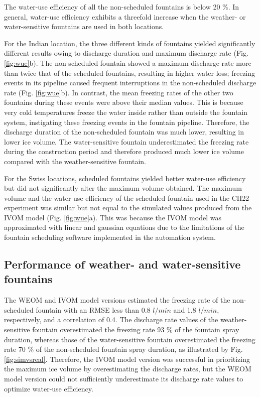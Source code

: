 \documentclass[tc, manuscript]{copernicus}
\begin{document}
The water-use efficiency of all the non-scheduled fountains is below 20 \%. In general, water-use efficiency
exhibits a threefold increase when the weather- or water-sensitive fountains are used in both
locations.  

For the Indian location, the three different kinds of fountains yielded significantly different results owing to
discharge duration and maximum discharge rate (Fig. \ref{fig:wue}b). The non-scheduled fountain showed a maximum
discharge rate more than twice that of the scheduled fountains, resulting in higher water loss; freezing events
in its pipeline caused frequent interruptions in the non-scheduled discharge rate (Fig. \ref{fig:wue}b). In
contrast, the mean freezing rates of the other two fountains during these events were above their median values.
This is because very cold temperatures freeze the water inside rather than outside the fountain system,
instigating these freezing events in the fountain pipeline. Therefore, the discharge duration of the non-scheduled
fountain was much lower, resulting in lower ice volume. The water-sensitive fountain underestimated the freezing
rate during the construction period and therefore produced much lower ice volume compared with the
weather-sensitive fountain. 

For the Swiss locations, scheduled fountains yielded better water-use efficiency but did not significantly alter
the maximum volume obtained. The maximum volume and the water-use efficiency of the scheduled fountain used in
the CH22 experiment was similar but not equal to the simulated values produced from the IVOM model (Fig.
\ref{fig:wue}a). This was because the IVOM model was approximated with linear and gaussian equations due to the
limitations of the fountain scheduling software implemented in the automation system.

\subsection{Performance of weather- and water-sensitive fountains}

The WEOM and IVOM model versions estimated the freezing rate of the non-scheduled fountain with an RMSE less than
0.8 $l/min$ and 1.8 $l/min$, respectively, and a correlation of 0.4. The discharge rate values of the
weather-sensitive fountain overestimated the freezing rate 93 \% of the fountain spray duration, whereas those
of the water-sensitive fountain overestimated the freezing rate 70 \% of the non-scheduled fountain spray
duration, as illustrated by Fig. \ref{fig:simvsreal}. Therefore, the IVOM model version was successful in
prioritizing the maximum ice volume by overestimating the discharge rates, but the WEOM model version could not
sufficiently underestimate its discharge rate values to optimize water-use efficiency.
\end{document}

